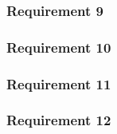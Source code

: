 \subsubsection*{Requirement 9}

\subsubsection*{Requirement 10}

\subsubsection*{Requirement 11}

\subsubsection*{Requirement 12}














